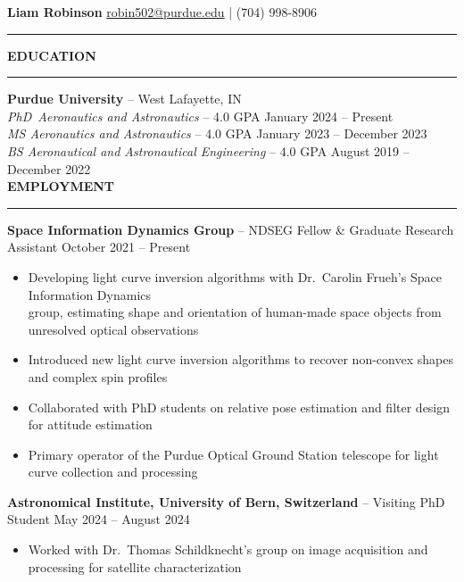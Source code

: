 \documentclass[10pt, a4paper]{article}
\newcommand{\sectiontitle}[1]{{\Large \textbf{#1}}\vspace{0.5em}\hrule\vspace{0.5em}}
\begin{document}
\thispagestyle{empty}

\sffamily
\renewcommand*{\bibfont}{\normalfont\normalsize\sffamily}

\noindent
\textbf{\huge Liam Robinson} \hfill \href{mailto:robin502@purdue.edu}{robin502@purdue.edu} | (704) 998-8906
\rule{\linewidth}{4pt}
\vspace{-0.5em}

\sectiontitle{EDUCATION}
\textbf{Purdue University} -- West Lafayette, IN \\
\textit{PhD\ Aeronautics and Astronautics} -- 4.0 GPA \hfill January 2024 -- Present \\
\textit{MS \hspace{1px} Aeronautics and Astronautics} -- 4.0 GPA \hfill January 2023 -- December 2023 \\
\textit{BS \hspace{3px} Aeronautical and Astronautical Engineering} -- 4.0 GPA \hfill August 2019 -- December 2022 \\

\sectiontitle{EMPLOYMENT}
\textbf{Space Information Dynamics Group} -- NDSEG Fellow \& Graduate Research Assistant \hfill October 2021 -- Present
\begin{itemize}[noitemsep]
    \item Developing light curve inversion algorithms with Dr.\ Carolin Frueh's Space Information Dynamics \\group, estimating shape and orientation of human-made space objects from unresolved optical observations
    \item Introduced new light curve inversion algorithms to recover non-convex shapes and complex spin profiles
    \item Collaborated with PhD students on relative pose estimation and filter design for attitude estimation
    \item Primary operator of the Purdue Optical Ground Station telescope for light curve collection and processing
\end{itemize}

\textbf{Astronomical Institute, University of Bern, Switzerland} -- Visiting PhD Student \hfill May 2024 -- August 2024
\begin{itemize}[noitemsep]
    \item Worked with Dr.\ Thomas Schildknecht's group on image acquisition and processing for satellite characterization
\end{itemize}
\end{document}
